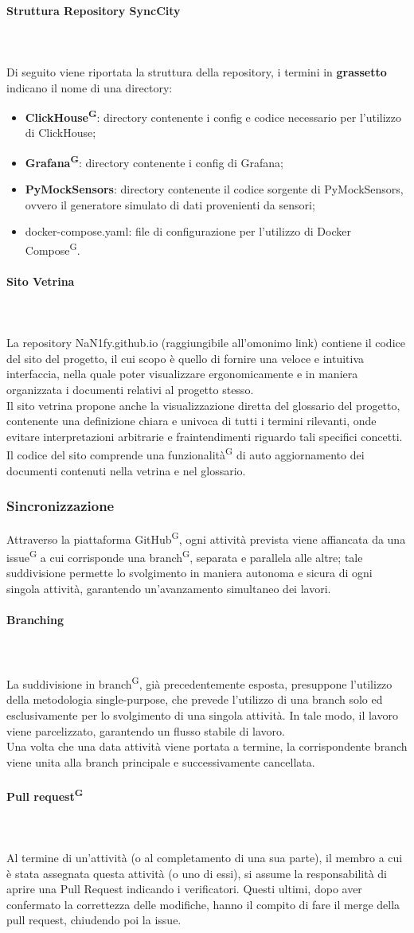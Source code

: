 \documentclass[8pt]{article}
\newcommand{\glossterm}[1]{#1\textsuperscript{G}} %
\newcommand{\subsubsubsection}[1]{\paragraph{#1}\mbox{}\\}
\begin{document}
\subsubsubsection{Struttura Repository SyncCity} \\
Di seguito viene riportata la struttura della repository, i termini in \textbf{grassetto} indicano il nome di una directory:
\begin{itemize}
    \item \textbf{\glossterm{ClickHouse}}: directory contenente i config e codice necessario per l'utilizzo di ClickHouse;
    \item \textbf{\glossterm{Grafana}}: directory contenente i config di Grafana;
    \item \textbf{PyMockSensors}: directory contenente il codice sorgente di PyMockSensors, ovvero il generatore simulato di dati provenienti da sensori;
    \item docker-compose.yaml: file di configurazione per l'utilizzo di \glossterm{Docker Compose}.
\end{itemize}
\subsubsubsection{Sito Vetrina} \\
La repository NaN1fy.github.io (raggiungibile all'omonimo link) contiene il codice del sito del progetto, il cui scopo è quello di fornire una veloce e intuitiva interfaccia, nella quale poter visualizzare ergonomicamente e in maniera organizzata i documenti relativi al progetto stesso. \\
Il sito vetrina propone anche la visualizzazione diretta del glossario del progetto, contenente una definizione chiara e univoca di tutti i termini rilevanti, onde evitare interpretazioni arbitrarie e fraintendimenti riguardo tali specifici concetti. \\
Il codice del sito comprende una \glossterm{funzionalità} di auto aggiornamento dei documenti contenuti nella vetrina e nel glossario.
\subsubsection{Sincronizzazione}
Attraverso la piattaforma \glossterm{GitHub}, ogni attività prevista viene affiancata da una \glossterm{issue} a
cui corrisponde una \glossterm{branch}, separata e parallela alle altre; tale suddivisione permette lo svolgimento in maniera autonoma e sicura di ogni singola attività, garantendo un'avanzamento simultaneo dei lavori.
\subsubsubsection{Branching} \\
La suddivisione in \glossterm{branch}, già precedentemente esposta, presuppone l'utilizzo della metodologia single-purpose, che prevede l'utilizzo di una branch solo ed esclusivamente per lo svolgimento di una singola attività. In tale modo, il lavoro viene parcelizzato, garantendo un flusso stabile di lavoro. \\
Una volta che una data attività viene portata a termine, la corrispondente branch viene unita alla branch principale e successivamente cancellata.
\subsubsubsection{\glossterm{Pull request}} \\
Al termine di un'attività (o al completamento di una sua parte), il membro a cui è stata assegnata questa attività (o uno di essi), si assume la responsabilità di aprire una Pull Request indicando i verificatori. Questi ultimi, dopo aver confermato la correttezza delle modifiche, hanno il compito di fare il merge della pull request, chiudendo poi la issue.
\end{document}
